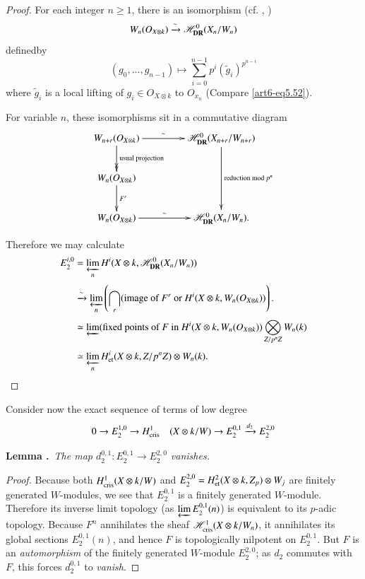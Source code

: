 \begin{proof}
For each integer $n\geq 1$, there is an isomorphism (cf. \cite{art6-key24}, \cite{art6-key25})
$$
W_{n}(O_{X\otimes k})\xrightarrow{\sim} \mathscr{H}^{0}_{\mathbf{DR}}(X_{n}/W_{n})
$$
defined\pageoriginale by
$$
(g_{0},\ldots,g_{n-1})\mapsto \sum\limits^{n-1}_{i=0}p^{i}(\widetilde{g}_{i})^{p^{n-i}}
$$
where $\widetilde{g}_{i}$ is a local lifting of $g_{i}\in O_{X\otimes k}$ to $O_{x_{n}}$ (Compare \eqref{art6-eq5.52}).

For variable $n$, these isomorphisms sit in a commutative diagram
\[
\xymatrix@C=1.5cm{
W_{n+r}(O_{X\otimes k})\ar@{->>}[d]^-{\text{usual projection}}\ar[r]^-{\sim} & \mathscr{H}^{0}_{\DR}(X_{n+r}/W_{n+r})\ar[dd]^-{\text{reduction mod $p^{n}$}}\\
W_{n}(O_{X\otimes k})\ar[d]^-{F^{r}} & \\
W_{n}(O_{X\otimes k})\ar[r]^-{\sim} & \mathscr{H}^{0}_{\DR}(X_{n}/W_{n}).
}
\]

Therefore we may calculate
\begin{align*}
E^{i,0}_{2} &= \varprojlim\limits_{n} H^{i}(X\otimes k, \mathscr{H}^{0}_{\mathbf{DR}}(X_{n}/W_{n}))\\[3pt]
          &\xrightarrow{\sim} \varprojlim\limits_{n}\left(\bigcap\limits_{r}(\text{image of~ } F^{r}\text{~ or~ } H^{i}(X\otimes k, W_{n}(O_{X\otimes k}))\right).\\[3pt]
&\simeq \varprojlim (\text{fixed points of~ } F\text{~ in~ } H^{i}(X\otimes k, W_{n}(O_{X\otimes k}))\bigotimes\limits_{Z/p^{n}Z} W_{n}(k)\\[3pt]
&\simeq \varprojlim\limits_{n} H^{i}_{\operatorname{et}}(X\otimes k, Z/p^{n}Z)\otimes W_{n}(k).
\end{align*}
\end{proof}

Consider now the exact sequence of terms of low degree
$$
0\to E^{1,0}_{2}\to H^{1}_{\operatorname{cris}}\quad (X\otimes k/W)\to E^{0,1}_{2}\xrightarrow{d_{2}}E^{2,0}_{2}
$$

\noindent
{\bf Lemma .\label{art6-lem8.3}}~{\em The map $d^{0,1}_{2}:E^{0,1}_{2}\to E^{2,0}_{2}$ vanishes.}

\begin{proof}
Because both $H^{1}_{\operatorname{cris}}(X\otimes k/W)$ and $E^{2,0}_{2}=H^{2}_{\operatorname{et}}(X\otimes k,Z_{p})\otimes W_{j}$ are finitely generated $W$-modules, we see that $E^{0,1}_{2}$ is a finitely generated $W$-module. Therefore its inverse limit topology (as $\varprojlim E^{0,1}_{2}(n)$) is equivalent to its $p$-adic topology. Because $F^{n}$ annihilates the sheaf $\mathscr{H}^{1}_{\operatorname{cris}}(X\otimes k/W_{n})$, it annihilates its global sections $E^{0,1}_{2}(n)$, and hence $F$ is topologically nilpotent on $E^{0,1}_{2}$. But $F$ is an {\em automorphism} of the finitely generated $W$-module $E^{2,0}_{2}$; as $d_{2}$ commutes with $F$, this forces $d^{0,1}_{2}$ to {\em vanish}.
\end{proof}


